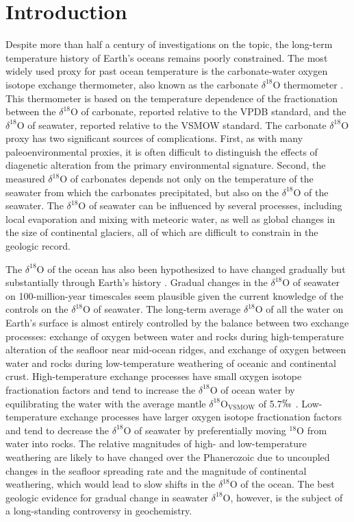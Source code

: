 \documentclass[5p, authoryear]{elsarticle}
\begin{document}
\section{Introduction}

Despite more than half a century of investigations on the topic, the long-term temperature history of Earth's oceans remains poorly constrained. The most widely used proxy for past ocean temperature is the carbonate-water oxygen isotope exchange thermometer, also known as the carbonate $\delta^{18}$O thermometer \citep{Urey1947}. This thermometer is based on the temperature dependence of the fractionation between the $\delta^{18}$O of carbonate, reported relative to the VPDB standard, and the $\delta^{18}$O of seawater, reported relative to the VSMOW standard. The carbonate $\delta^{18}$O proxy has two significant sources of complications. First, as with many paleoenvironmental proxies, it is often difficult to distinguish the effects of diagenetic alteration from the primary environmental signature. Second, the measured $\delta^{18}$O of carbonates depends not only on the temperature of the seawater from which the carbonates precipitated, but also on the $\delta^{18}$O of the seawater. The $\delta^{18}$O of seawater can be influenced by several processes, including local evaporation and mixing with meteoric water, as well as global changes in the size of continental glaciers, all of which are difficult to constrain in the geologic record. 

The $\delta^{18}$O of the ocean has also been hypothesized to have changed gradually but substantially through Earth's history \citep{Jaffres2007, Veizer1999}. Gradual changes in the $\delta^{18}$O of seawater on 100-million-year timescales seem plausible given the current knowledge of the controls on the $\delta^{18}$O of seawater. The long-term average $\delta^{18}$O of all the water on Earth's surface is almost entirely controlled by the balance between two exchange processes: exchange of oxygen between water and rocks during high-temperature alteration of the seafloor near mid-ocean ridges, and exchange of oxygen between water and rocks during low-temperature weathering of oceanic and continental crust. High-temperature exchange processes have small oxygen isotope fractionation factors and tend to increase the $\delta^{18}$O of ocean water by equilibrating the water with the average mantle $\delta^{18}$O$_{\text{VSMOW}}$ of 5.7$\permil$ \citep{Gregory1991}. Low-temperature exchange processes have larger oxygen isotope fractionation factors and tend to decrease the $\delta^{18}$O of seawater by preferentially moving $^{18}$O from water into rocks. The relative magnitudes of high- and low-temperature weathering are likely to have changed over the Phanerozoic due to uncoupled changes in the seafloor spreading rate \citep{Fornari1995, Tajika1993, Wallmann2001} and the magnitude of continental weathering, which would lead to slow shifts in the $\delta^{18}$O of the ocean. The best geologic evidence for gradual change in seawater $\delta^{18}$O, however, is the subject of a long-standing controversy in geochemistry. 
\end{document}
